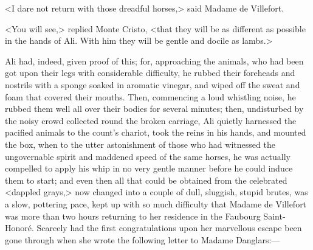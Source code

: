  <I dare not return with those dreadful horses,> said Madame de Villefort. 

 <You will see,> replied Monte Cristo, <that they will be as different as possible in the hands of Ali. With him they will be gentle and docile as lambs.> 

 Ali had, indeed, given proof of this; for, approaching the animals, who had been got upon their legs with considerable difficulty, he rubbed their foreheads and nostrils with a sponge soaked in aromatic vinegar, and wiped off the sweat and foam that covered their mouths. Then, commencing a loud whistling noise, he rubbed them well all over their bodies for several minutes; then, undisturbed by the noisy crowd collected round the broken carriage, Ali quietly harnessed the pacified animals to the count's chariot, took the reins in his hands, and mounted the box, when to the utter astonishment of those who had witnessed the ungovernable spirit and maddened speed of the same horses, he was actually compelled to apply his whip in no very gentle manner before he could induce them to start; and even then all that could be obtained from the celebrated <dappled grays,> now changed into a couple of dull, sluggish, stupid brutes, was a slow, pottering pace, kept up with so much difficulty that Madame de Villefort was more than two hours returning to her residence in the Faubourg Saint-Honoré.  Scarcely had the first congratulations upon her marvellous escape been gone through when she wrote the following letter to Madame Danglars:— 

